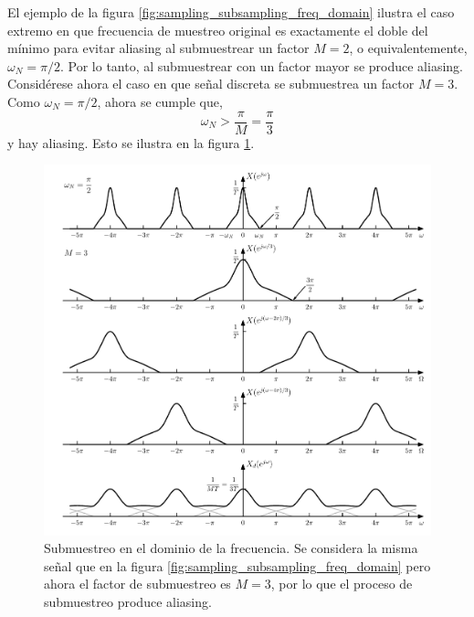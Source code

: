 \documentclass[a4paper]{report}
\begin{document}
El ejemplo de la figura \ref{fig:sampling_subsampling_freq_domain} ilustra el caso extremo en que frecuencia de muestreo original es exactamente el doble del mínimo para evitar aliasing al submuestrear un factor \(M=2\), o equivalentemente, \(\omega_N=\pi/2\). Por lo tanto, al submuestrear con un factor mayor se produce aliasing. Considérese ahora el caso en que señal discreta se submuestrea un factor \(M=3\). 
Como \(\omega_N=\pi/2\), ahora se cumple que,
\[
 \omega_N>\frac{\pi}{M}=\frac{\pi}{3}
\]
y hay aliasing. Esto se ilustra en la figura \ref{fig:sampling_subsampling_freq_domain_aliasing}.
\begin{figure}[!htb]
 \begin{center}
 \includegraphics[width=1\textwidth]{figuras/sampling_subsampling_freq_domain_aliasing.pdf}
 \caption{\label{fig:sampling_subsampling_freq_domain_aliasing} Submuestreo en el dominio de la frecuencia. Se considera la misma señal que en la figura \ref{fig:sampling_subsampling_freq_domain} pero ahora el factor de submuestreo es \(M=3\), por lo que el proceso de submuestreo produce aliasing.}
 \end{center}
\end{figure}
\end{document}
